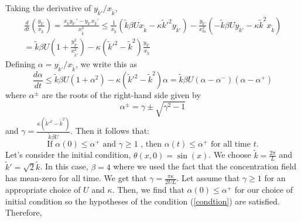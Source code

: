 \documentclass[12pt]{article}
\begin{document}
Taking the derivative of $y_{\tilde{k}'}/x_{\tilde{k}}$,
\begin{multline}
\frac{d}{dt}\left(\frac{y_{\tilde{k}'}}{x_{\tilde{k}}}\right)=\frac{x_{\tilde{k}}y_{\tilde{k}'}'-y_{\tilde{k}'}x_{\tilde{k}}'}{x_{\tilde{k}}^2}\leq \frac{1}{x_{\tilde{k}}}( \tilde{k}\beta U x_{\tilde{k}} - \kappa\tilde{k}'^{2}  y_{\tilde{k}'}) - \frac{y_{\tilde{k}'}}{x_{m}^2}( - \tilde{k}\beta U  y_{\tilde{k}'} - \kappa \tilde{k}^{2}  x_{\tilde{k}} ) \\
=\tilde{k}\beta U \left(1+\frac{y_{\tilde{k}'}^2}{x_{\tilde{k}'}^{2}}\right) - \kappa (\tilde{k}'^2-\tilde{k}^{2})\frac{y_{\tilde{k}'}}{x_{\tilde{k}}}
\end{multline}
Defining $\alpha = y_{\tilde{k}'}/x_{\tilde{k}}$, we write this as 
\begin{equation}
\label{eq:alpha}
\frac{d\alpha}{dt}\leq \tilde{k}\beta U\left(1+\alpha^2\right) - \kappa (\tilde{k}'^2-\tilde{k}^2)\alpha=\tilde{k}\beta U(\alpha -\alpha^{-})(\alpha -\alpha^{+})
\end{equation}
where $\alpha^{\pm}$ are the roots of the right-hand side given by
\begin{equation*}
\alpha^{\pm}=\gamma  \pm \sqrt{\gamma^{2}  - 1}
\end{equation*}
and $\gamma = \frac{\kappa  (\tilde{k}'^2-\tilde{k}^2)}{\tilde{k}\beta U}$. Then it follows that:
\begin{equation}
\label{condtion}
\text{ If $\alpha(0) \leq \alpha^{+}$ and $\gamma\geq 1$ , then $\alpha(t)\leq \alpha^{+}$ for all time $t$. }
\end{equation}
Let's consider the initial condition, $\theta(x,0)=\sin(x)$. We choose $\tilde{k}=\frac{2\pi}{L}$ and $\tilde{k}'=\sqrt{2}\tilde{k}$. In this case, $\beta=4$ where we used the fact that the concentration field has mean-zero for all time. We get that $\gamma= \frac{\pi\kappa}{2UL}$. Let assume that $\gamma\geq 1$ for an appropriate choice of $U$ and $\kappa$. Then, we find that $\alpha(0)\leq \alpha^{+}$ for our choice of initial condition so the hypotheses of the condition (\ref{condtion}) are satisfied. Therefore,
\end{document}
